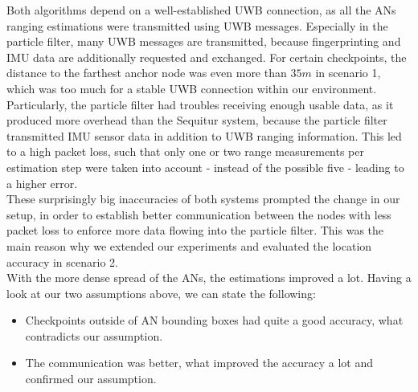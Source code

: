 \noindent\hspace*{5mm}%
Both algorithms depend on a well-established UWB connection, as all the ANs ranging estimations were transmitted using UWB messages. Especially in the particle filter, many UWB messages are transmitted, because fingerprinting and IMU data are additionally requested and exchanged. For certain checkpoints, the distance to the farthest anchor node was even more than $35m$ in scenario 1, which was too much for a stable UWB connection within our environment. Particularly, the particle filter had troubles receiving enough usable data, as it produced more overhead than the Sequitur system, because the particle filter transmitted IMU sensor data in addition to UWB ranging information. This led to a high packet loss, such that only one or two range measurements per estimation step were taken into account - instead of the possible five - leading to a higher error. \\
\noindent\hspace*{5mm}%
These surprisingly big inaccuracies of both systems prompted the change in our setup, in order to establish better communication between the nodes with less packet loss to enforce more data flowing into the particle filter. This was the main reason why we extended our experiments and evaluated the location accuracy in scenario 2.\\
\noindent\hspace*{5mm}%
With the more dense spread of the ANs, the estimations improved a lot. Having a look at our two assumptions above, we can state the following:

\begin{itemize}
\item Checkpoints outside of AN bounding boxes had quite a good accuracy, what contradicts our assumption.
\item The communication was better, what improved the accuracy a lot and confirmed our assumption.
\end{itemize}

